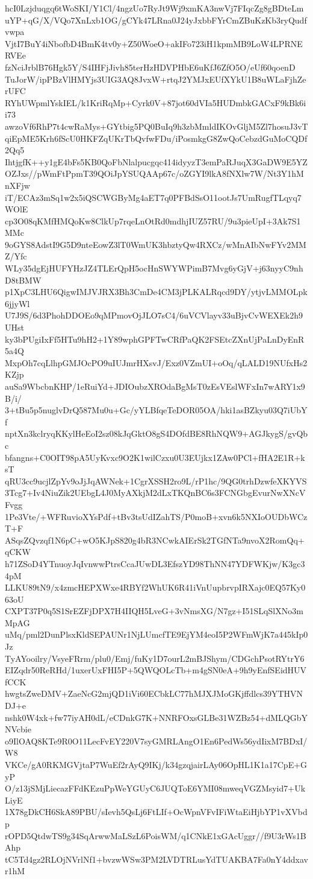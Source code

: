 hcI0Lzjduqgq6tWoSKI/Y1Cl/4ngzUo7RyJt9Wj9xmKA3nwVj7FIqcZg8gBDteLm
uYP+qG/X/VQo7XnLxb1OG/gCYk47LRna0J24yJxbbFYrCmZBuKzKb3ryQudfvwpa
VjtI7BuY4iNbofbD4BmK4tv0y+Z50WoeO+akIFo723iH1kpmMB9LoW4LPRNERVEe
fzNciJrblB76Hgk5Y/S4IHFjJivh85terHzHDVPHbE6uKfJ6ZfO5O/eUf60qoenD
TuJorW/ipPBzVlHMYjs3UIG3AQ8JvxW+rtqJ2YMJxEUfXYkU1B8uWLaFjhZerUFC
RYhUWpmlYskIEL/k1KriRqMp+Cyrk0V+87jot60dVIa5HUDmbkGACxF9kBk6ii73
awzoVf6RhP7t4cwRaMys+GYtbig5PQ0BuIq9h3zbMmldIKOvGljM5Zl7hosuJ3vT
qiEpME5Krh6fScU0HKFZqUKrTbQvfwFDu/iPosmkgG8ZwQoCebzdGuMoCQDf2Qq5
IhtjgfK++y1gE4bFs5KB0QoFbNlalpucgqc414idyyzT3emPaRJuqX3GaDW9E5YZ
OZJxs//pWmFtPpmT39QOiJpYSUQAAp67c/oZGYI9lkA8fNXlw7W/Nt3Y1hMnXFjw
iT/ECAz3mSq1w2x5iQSCWGByMg4aET7q0PFBdSsO11ootJs7UmRugfTLqyq7WOlE
cp3O08qKMfHMQoKw8ClkUp7rqeLnOtRd0mdhjIUZ57RU/9u3pieUpI+3Ak7S1MMc
9oGYS8AdstI9G5D9nteEowZ3lT0WmUK3hbztyQw4RXCz/wMnAIbNwFYv2MMZ/Yfc
WLy35dgEjHUFYHzJZ4TLErQpH5ocHnSWYWPimB7Mvg6yGjV+j63nyyC9nhD8tBMW
p1XpC3LHU6QigwIMJVJRX3Bh3CmDe4CM3jPLKALRqcd9DY/ytjvLMMOLpk6jjyWl
U7J9S/6d3PhohDDOEo9qMPmovOjJLO7sC4/6uVCVlayv33uBjvCvWEXEk2h9UHst
ky3bPUgiIxFf5HTu9hH2+1Y89wphGPFTwCRfPaQK2FSEtcZXnUjPaLnDyEnR5a4Q
MxpOh7cqLlhpGMJOcPO9uIUJmrHXsvJ/Exz0VZmUI+oOq/qLALD19NUfxHs2KZjp
auSa9WbcbnKHP/1eRuiYd+JDIOubzXROdaBgMsT0zEsVEslWFxIn7wARY1x9B/i/
3+tBu5p5nuglvDrQ587Mu0u+Gc/yYLBfqeTeDOR05OA/hki1asBZkyu03Q7iUbYf
nptXn3kclryqKKylHeEoI2sz08kJqGktO8gS4DOfdBE8RhNQW9+AGJkygS/gvQbc
bfangns+C0OIT98pA5UyKvxc9O2K1wilCzxu0U3EUjkx1ZAw0PCl+fHA2E1R+ksT
qRU3cc9ucjlZpYv9oJjJqAWNek+1CgrXSSH2ro9L/rP1hc/9QG0trhDzwfeXKYVS
3Tcg7+Iv4NiuZik2UEbgL4J0MyAXkjM2dLxTKQnBC6s3FCNGbgEvurNwXNcVFvgg
1Pe3Vte/+WFRuvioXYsPdf+tBv3tsUdIZahTS/P0moB+xvn6k5NXIoOUDbWCzT+F
ASqsZQvzqf1N6pC+wO5KJpS820g4bR3NCwkAIErSk2TGfNTa9nvoX2RomQq+qCKW
h71ZSoD4YTnuoyJqIvnwwPtrsCcaJUwDL3EfszYD98ThNN47YDFWKjw/K3gc34pM
LLKU89tN9/x4zmcHEPXWxe4RBYf2WhUK6R41iVnUupbrvpIRXajc0EQ57Ky063oU
CXPT37P0q5S1SrEZFjDPX7H4IIQH5LveG+3vNmsXG/N7gz+I51SLqSlXNo3mMpAG
uMq/pml2DunPlsxKldSEPAUNr1NjLUmcfTE9EjYM4eoI5P2WFmWjK7a445kIp0Jz
TyAYooilry/VsyeFRrm/plu0/Emj/fuKy1D7ourL2mBJShym/CDGchPsotRYtrY6
EIZqdr50ReRHd/1uxerUxFHI5P+5QWQOLcTb+m4gSN0eA+9h9yEnfSEidHUVfCCK
hwgtsZweDMV+ZaeNcG2mjQD1iVi60ECbkLC77hMJXJMoGKjffdlcs39YTHVNDJ+e
nshk0W4xk+fw77iyAH0dL/eCDnkG7K+NNRFOxsGLBe31WZBz54+dMLQGbYNVcbie
o9IlOAQ8KTe9R0O11LecFvEY220V7syGMRLAngO1En6PedWs56ydIixM7BDxI/W8
VKCe/gA0RKMGVjtaP7WuEf2rAyQ9IKj/k34gzqjairLAy06OpHL1K1a17CpE+GyP
O/z13jSMjLiecazFFdKEzuPpWeYGUyC6JUQToE6YMI08mweqVGZMsyid7+UkLiyE
1X78gDkCH6SkA89PBU/sIevh5QsLj6FtLIf+OcWpnVFvIFiWtaEiHjbYP1vXVbdp
rOPD5QtdwTS9g34SqArwwMaLSzL6PoisWM/q1CNkE1xGAcUggr//f9U3rWs1BAhp
tC5Td4gz2RLOjNVrlNf1+bvzwWSw3PM2LVDTRLusYdTUAKBA7Fa0nY4ddxavr1hM
